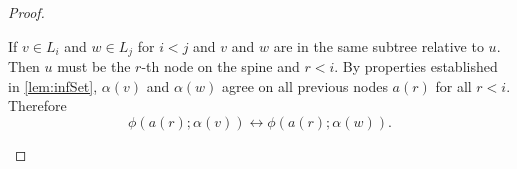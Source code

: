 \begin{proof}
\begin{outline}
{}
                \4 If $v\in L_i$ and $w\in L_j$ for $i<j$ and $v$ and $w$ are in the same subtree relative to $u$.\\
                Then $u$ must be the $r$-th node on the spine and $r<i$. By properties established in \cref{lem:infSet}, $\alpha(v)$ and $\alpha(w)$ agree on all previous nodes $a(r)$ for all $r < i$. Therefore 
                $$\phi(a(r);\alpha(v))\leftrightarrow\phi(a(r);\alpha(w)).$$
\end{outline}
\end{proof}

